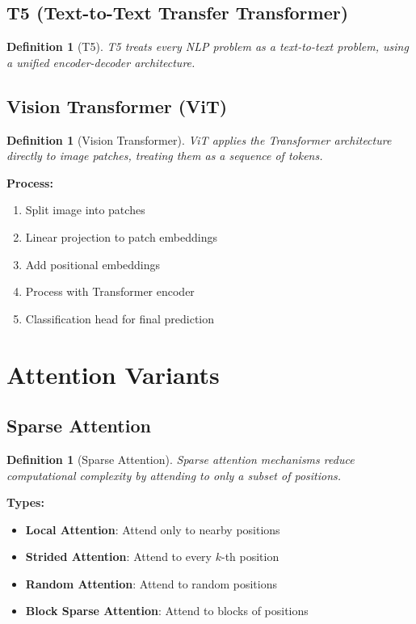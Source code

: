 \documentclass[11pt,a4paper]{article}
\newtheorem{definition}[theorem]{Definition}
\begin{document}
\subsection{T5 (Text-to-Text Transfer Transformer)}

\begin{definition}[T5]
T5 treats every NLP problem as a text-to-text problem, using a unified encoder-decoder architecture.
\end{definition}

\subsection{Vision Transformer (ViT)}

\begin{definition}[Vision Transformer]
ViT applies the Transformer architecture directly to image patches, treating them as a sequence of tokens.
\end{definition}

\textbf{Process:}
\begin{enumerate}
\item Split image into patches
\item Linear projection to patch embeddings
\item Add positional embeddings
\item Process with Transformer encoder
\item Classification head for final prediction
\end{enumerate}

\section{Attention Variants}

\subsection{Sparse Attention}

\begin{definition}[Sparse Attention]
Sparse attention mechanisms reduce computational complexity by attending to only a subset of positions.
\end{definition}

\textbf{Types:}
\begin{itemize}
\item \textbf{Local Attention}: Attend only to nearby positions
\item \textbf{Strided Attention}: Attend to every $k$-th position
\item \textbf{Random Attention}: Attend to random positions
\item \textbf{Block Sparse Attention}: Attend to blocks of positions
\end{itemize}
\end{document}

